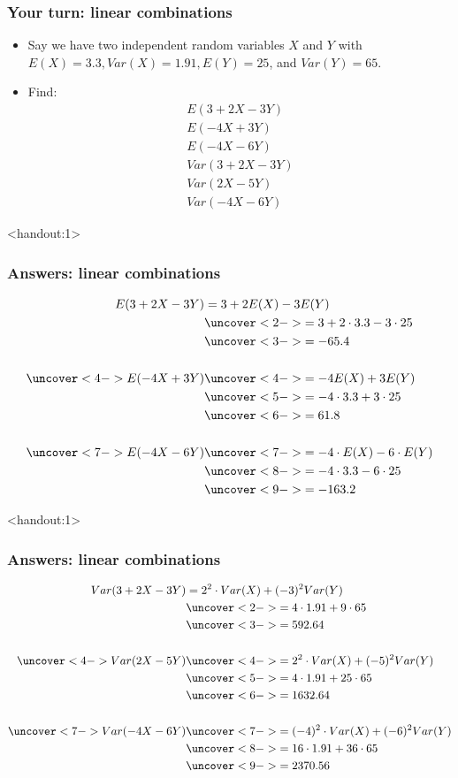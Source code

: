 \documentclass[handout]{beamer}\usepackage[]{graphicx}\usepackage[]{color}
\newcommand{\answers}{1}
\numberwithin{equation}{section}
\begin{document}
\begin{frame}
\frametitle{Your turn: linear combinations}
\begin{itemize}
\item Say we have two independent random variables $X$ and $Y$ with $E(X) = 3.3, Var(X) = 1.91, E(Y) = 25$, and $Var(Y) = 65$.
\item Find:
\begin{align*}
E(3 + 2X - 3Y) \\
E(-4 X + 3Y) \\
E(-4X - 6Y) \\
Var(3 + 2X - 3Y) \\ 
Var(2X - 5Y) \\
Var(-4X - 6Y)  
\end{align*}
\end{itemize}
\end{frame}

\begin{frame}<handout:\answers>
\frametitle{Answers: linear combinations}
\begin{align*}
E(3 + 2X - 3Y) &= 3 + 2 E(X) - 3 E(Y) \\
& \uncover<2->{= 3 + 2 \cdot 3.3 - 3 \cdot 25} \\
& \uncover<3->{= -65.4} \\ \\
\uncover<4->{E(-4 X + 3Y)} & \uncover<4->{= -4 E(X) + 3 E(Y)} \\
&\uncover<5->{ = -4 \cdot 3.3 + 3 \cdot 25} \\
&\uncover<6->{ = 61.8} \\ \\
\uncover<7->{E(-4X - 6Y)} & \uncover<7->{ = -4 \cdot E(X) - 6 \cdot E(Y)} \\
& \uncover<8->{= -4 \cdot 3.3 - 6 \cdot 25} \\
& \uncover<9->{= -163.2}
\end{align*}
\end{frame}

\begin{frame}<handout:\answers>
\frametitle{Answers: linear combinations}
\begin{align*}
Var(3 + 2X - 3Y) &= 2^2 \cdot Var(X) + (-3)^2 Var(Y) \\ 
&\uncover<2->{ = 4 \cdot 1.91 + 9 \cdot 65} \\
& \uncover<3->{= 592.64} \\ \\
\uncover<4->{Var(2X - 5Y)} & \uncover<4->{= 2^2 \cdot Var(X) + (-5)^2 Var(Y)} \\
& \uncover<5->{= 4 \cdot 1.91 + 25 \cdot 65} \\
& \uncover<6->{= 1632.64} \\ \\
\uncover<7->{Var(-4X - 6Y)} & \uncover<7->{= (-4)^2 \cdot Var(X) + (-6)^2 Var(Y)} \\
& \uncover<8->{= 16 \cdot 1.91 + 36 \cdot 65} \\
&\uncover<9->{ = 2370.56}
\end{align*} 
\end{frame}
\end{document}
